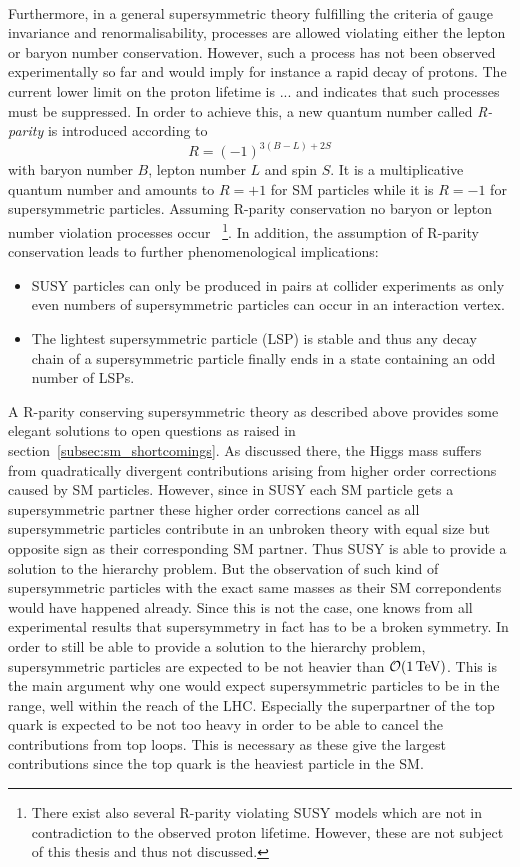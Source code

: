 \\
Furthermore, in a general supersymmetric theory fulfilling the criteria of gauge invariance and renormalisability, processes are allowed violating either the lepton or baryon number conservation. However, such a process has not been observed experimentally so far and would imply for instance a rapid decay of protons. The current lower limit on the proton lifetime is ...  and indicates that such processes must be suppressed. In order to achieve this, a new quantum number called \textit{R-parity} is introduced according to
\begin{equation*}
R = (-1)^{3(B-L) + 2S}
\end{equation*}
with baryon number $B$, lepton number $L$ and spin $S$. It is a multiplicative quantum number and amounts to $R= +1$ for SM particles while it is $R = -1$ for supersymmetric particles. Assuming R-parity conservation no baryon or lepton number violation processes occur  ~\footnote{There exist also several R-parity violating SUSY models which are not in contradiction to the observed proton lifetime. However, these are not subject of this thesis and thus not discussed.}. In addition, the assumption of R-parity conservation leads to further phenomenological implications:
\begin{itemize}
\item SUSY particles can only be produced in pairs at collider experiments as only even numbers of supersymmetric particles can occur in an interaction vertex.
\item The lightest supersymmetric particle (LSP) is stable and thus any decay chain of a supersymmetric particle finally ends in a state containing an odd number of LSPs.
\end{itemize}
A R-parity conserving supersymmetric theory as described above provides some elegant solutions to open questions as raised in section~\ref{subsec:sm_shortcomings}. As discussed there, the Higgs mass suffers from quadratically divergent contributions arising from higher order corrections caused by SM particles. However, since in SUSY each SM particle gets a supersymmetric partner these higher order corrections cancel as all supersymmetric particles contribute in an unbroken theory with equal size but opposite sign as their corresponding SM partner. Thus SUSY is able to provide a solution to the hierarchy problem. But the observation of such kind of supersymmetric particles with the exact same masses as their SM correpondents would have happened already. Since this is not the case, one knows from all experimental results that supersymmetry in fact has to be a broken symmetry. In order to still be able to provide a solution to the hierarchy problem, supersymmetric particles are expected to be not heavier than $\mathcal{O}(\mathrm{1\,\text{Te}\kern-0.06667em\text{V}})$. This is the main argument why one would expect supersymmetric particles to be in the \tev range, well within the reach of the LHC. Especially the superpartner of the top quark is expected to be not too heavy in order to be able to cancel the contributions from top loops. This is necessary as these give the largest contributions since the top quark is the heaviest particle in the SM. \\
